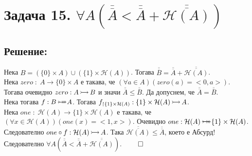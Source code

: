 \documentclass[12pt]{article}
\newcommand{\injection}[0]{\,\mathlarger{\mathlarger{\rightarrowtail}}\,}
\newcommand{\bijection}[0]{\mathbin{\mathlarger{\mathlarger{\rightarrowtail}} \hspace{-14pt} \mathlarger{\mathlarger{\twoheadrightarrow}}}}
\begin{document}
\section*{Задача 15. \(\forall A (\overline{\overline{A}} < \overline{\overline{A}} + \overline{\overline{\mathcal{H}(A)}})\)}

\subsection*{Решение:}
Нека \(B = (\{0\} \times A) \cup (\{1\} \times \mathcal{H}(A)) \).
Тогава \(\overline{\overline{B}} = \overline{\overline{A}} + \overline{\overline{\mathcal{H}(A)}}\).
\\
Нека \(zero \; : \; A \to \{0\} \times A\) е такава, че
\((\forall a \in A)(zero(a) = <0, a>)\).
\\
Тогава очевидно \(zero : A \injection B\)
и значи \(\overline{\overline{A}} \leq \overline{\overline{B}}\).
Да допуснем, че \(\overline{\overline{A}} = \overline{\overline{B}}\).
\\
Нека тогава \(f : B \bijection A\).
Тогава \(f_{\restriction \{1\} \times \mathcal{H}(A)} :
\{1\} \times \mathcal{H}(A) \injection A\).
\\
Нека \(one \; : \; \mathcal{H}(A) \to \{1\} \times \mathcal{H}(A)\) е такава, че
\\
\((\forall x \in \mathcal{H}(A))(one(x) = <1, x>)\).
Очевидно \(one : \mathcal{H}(A) \bijection \{1\} \times \mathcal{H}(A)\).
Следователно \(one \circ f : \mathcal{H}(A) \injection A\).
Така \(\overline{\overline{\mathcal{H}(A)}} \leq \overline{\overline{A}}\), което е Абсурд!
Следователно \(\forall A (\overline{\overline{A}} < \overline{\overline{A}} + \overline{\overline{\mathcal{H}(A)}})\). \(\qed\)
\end{document}

